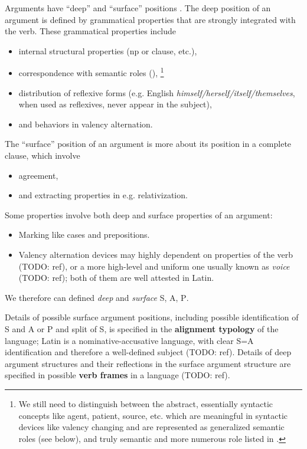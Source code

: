 \documentclass[a4paper, oneside, 12pt]{report}
\newcommand*{\citesec}[1]{\S~{#1}}
\newcommand*{\concept}[1]{\textbf{#1}}
\newcommand{\form}[1]{\emph{#1}}
\newcommand*{\category}[1]{\textsc{#1}}
\begin{document}
Arguments have ``deep'' and ``surface'' positions \citep{dixon2009basic1}. 
The deep position of an argument is defined by 
grammatical properties that are strongly integrated with the verb.
These grammatical properties include 
\begin{itemize}
    \item internal structural properties (\acs{np} or clause, etc.),
    \item correspondence with semantic roles 
    (\citealt[\citesec{4.2}]{cgel}),%
    \footnote{
        We still need to distinguish between the abstract, 
        essentially syntactic concepts like agent, patient, source, etc.
        which are meaningful in syntactic devices like valency changing
        and are represented as generalized semantic roles (see below),
        and truly semantic and more numerous role listed in 
        \citet{dixon2005semantic}.
    }
    \item distribution of reflexive forms 
    (e.g. English \form{himself/herself/itself/themselves}, when used as reflexives, 
    never appear in the subject),
    \item and behaviors in valency alternation. 
\end{itemize}
The ``surface'' position of an argument is more about its position 
in a complete clause, which involve 
\begin{itemize}
    \item agreement,
    \item and extracting properties in e.g. relativization.
\end{itemize}
Some properties involve both deep and surface properties of an argument:
\begin{itemize}
    \item Marking like cases and prepositions.
    \item Valency alternation devices 
    may highly dependent on properties of the verb (TODO: ref),
    or a more high-level and uniform one  
    usually known as \emph{voice} (TODO: ref);
    both of them are well attested in Latin.
\end{itemize}
We therefore can defined \emph{deep} and \emph{surface} \category{S}, \category{A}, \category{P}.

Details of possible surface argument positions,
including possible identification of \category{S} and \category{A} or \category{P} 
and split of \category{S},
is specified in the \concept{alignment typology} of the language;
Latin is a nominative-accusative language, 
with clear \category{S}=\category{A} identification 
and therefore a well-defined subject (TODO: ref).
Details of deep argument structures and their reflections in the surface argument structure 
are specified in possible \concept{verb frames} in a language
(TODO: ref).
\end{document}
